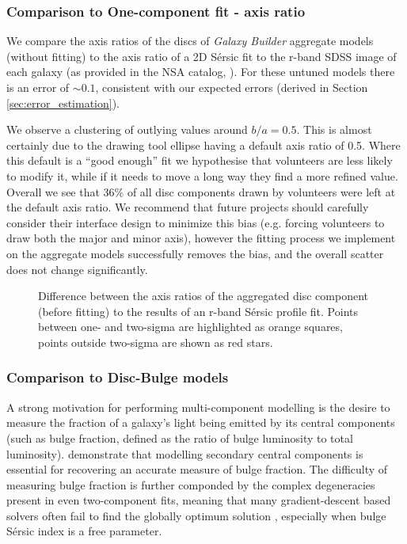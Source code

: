 \documentclass[../main.tex]{subfiles}
\begin{document}
\subsubsection{Comparison to One-component fit - axis ratio}

We compare the axis ratios of the discs of \textit{Galaxy Builder} aggregate models (without fitting) to the axis ratio of a 2D S\'ersic fit to the r-band SDSS image of each galaxy (as provided in the NSA catalog, \citealt{2011AJ....142...31B}). For these untuned models there is an error of $\sim0.1$, consistent with our expected errors (derived in Section \ref{sec:error_estimation}).

We observe a clustering of outlying values around $b/a=0.5$. This is almost certainly due to the drawing tool ellipse having a default axis ratio of 0.5. Where this default is a ``good enough'' fit we hypothesise that volunteers are less likely to modify it, while if it needs to move a long way they find a more refined value. Overall we see that 36\% of all disc components drawn by volunteers were left at the default axis ratio. We recommend that future projects should carefully consider their interface design to minimize this bias (e.g. forcing volunteers to draw both the major and minor axis), however the fitting process we implement on the aggregate models successfully removes the bias, and the overall scatter does not change significantly.

\begin{figure}
  \caption{Difference between the axis ratios of the aggregated disc component (before fitting) to the results of an r-band S\'ersic profile fit. Points  between one- and two-sigma are highlighted as orange squares, points outside two-sigma are shown as red stars.}
  \label{fig:ax_ratio_comparison}
\end{figure}


\subsubsection{Comparison to Disc-Bulge models}

A strong motivation for performing multi-component modelling is the desire to measure the fraction of a galaxy's light being emitted by its central components (such as bulge fraction, defined as the ratio of bulge luminosity to total luminosity). \citet{Gao2017:1709.00746v1} demonstrate that modelling secondary central components is essential for recovering an accurate measure of bulge fraction. The difficulty of measuring bulge fraction is further componded by the complex degeneracies present in even two-component fits, meaning that many gradient-descent based solvers often fail to find the globally optimum solution \citep{profit-paper}, especially when bulge S\'ersic index is a free parameter.
\end{document}
